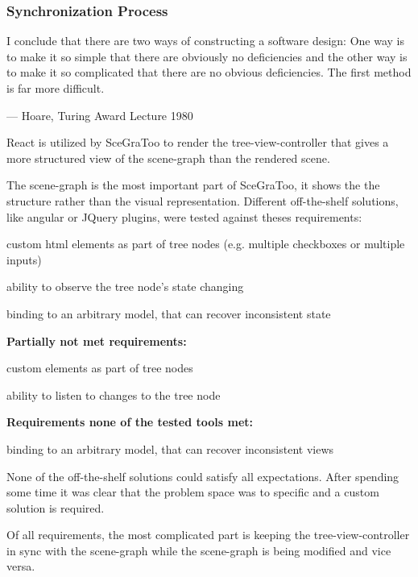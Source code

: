 \subsubsection{Synchronization Process}
\label{synchronization-process}

\epigraph{I conclude that there are two ways of constructing a software design:
One way is to make it so simple that there are obviously no deficiencies
and the other way is to make it so complicated that there are no obvious
deficiencies. The first method is far more difficult.}{--- Hoare, Turing Award Lecture 1980}

React is utilized by SceGraToo to render the tree-view-controller that
gives a more structured view of the scene-graph than the rendered scene.

The scene-graph is the most important part of SceGraToo, it shows the
the structure rather than the visual representation. Different
off-the-shelf solutions, like angular or JQuery plugins, were tested
against theses requirements:

\begin{enumerate*}
  \item custom html elements as part of tree nodes (e.g. multiple checkboxes or multiple inputs)
  \item ability to observe the tree node's state changing
  \item binding to an arbitrary model, that can recover inconsistent state
\end{enumerate*}

\textbf{Partially not met requirements:}

\begin{itemize*}
  \item custom elements as part of tree nodes
  \item ability to listen to changes to the tree node
\end{itemize*}

\textbf{Requirements none of the tested tools met:}

\begin{itemize*}
  \item binding to an arbitrary model, that can recover inconsistent views
\end{itemize*}

None of the off-the-shelf solutions could satisfy all expectations.
After spending some time it was clear that the problem space was to specific and a
custom solution is required.

Of all requirements, the most complicated part is keeping the tree-view-controller in sync
with the scene-graph while the scene-graph is being modified and vice
versa.

